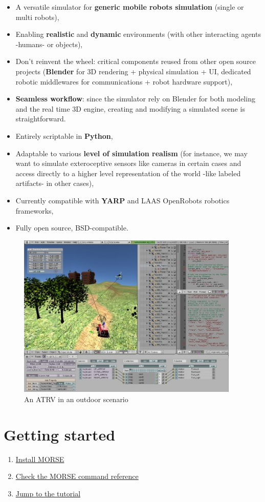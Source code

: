 \documentclass[twoside,a4paper,10pt]{report}
\newcommand{\dokutitleleveltwo}[1]{\section{#1}}
\newcommand{\dokubold}[1]{\textbf{#1}}
\newcommand{\dokuitem}{\item}
\begin{document}
\begin{itemize}
\dokuitem  A versatile simulator for \dokubold{generic mobile robots simulation} (single or multi robots),
\dokuitem  Enabling \dokubold{realistic} and \dokubold{dynamic} environments (with other interacting agents -humans- or objects), 
\dokuitem  Don't reinvent the wheel: critical components reused from other open source projects (\dokubold{Blender} for 3D rendering + physical simulation + UI, dedicated robotic middlewares for communications + robot hardware support),
\dokuitem  \dokubold{Seamless workflow}: since the simulator rely on Blender for both modeling and the real time 3D engine, creating and modifying a simulated scene is straightforward.
\dokuitem  Entirely scriptable in \dokubold{Python},
\dokuitem  Adaptable to various \dokubold{level of simulation realism} (for instance, we may want to simulate exteroceptive sensors like cameras in certain cases and access directly to a higher level representation of the world -like labeled artifacts- in other cases),
\dokuitem  Currently compatible with \dokubold{YARP} and LAAS OpenRobots robotics frameworks,
\dokuitem  Fully open source, BSD-compatible.
\end{itemize}

\begin{figure}[h]
\centering
\includegraphics[width=300pt]{outdoor_example.jpg}
\caption{An ATRV in an outdoor scenario}
\end{figure}



\dokutitleleveltwo{Getting started}
\label{46b862bd16703034ef594b2996ec8166}%

\begin{enumerate}\dokuitem  \hyperref[ea09bb364ef1bffd889e76b7a59035fc]{ Install MORSE}
\dokuitem  \hyperref[60efe788544a384827c39a9803dab85b]{ Check the MORSE command reference}
\dokuitem  \hyperref[0575c8d592fb7b088226750aceec2b4e]{ Jump to the tutorial}
\end{enumerate}
\end{document}
